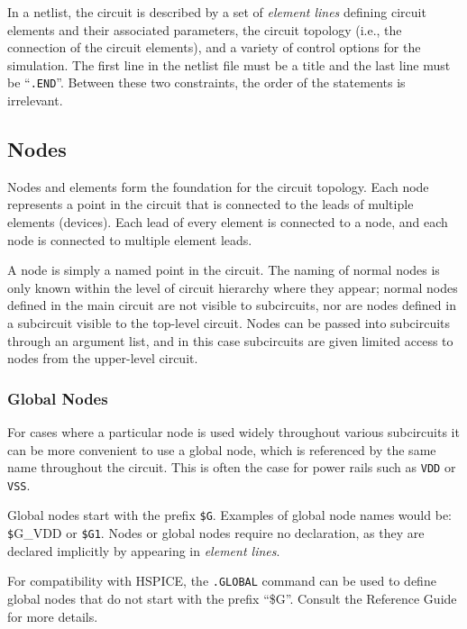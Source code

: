 In a netlist, the circuit is described by a set of \emph{element
lines\/} defining circuit elements and their associated parameters, the circuit topology (i.e., the connection of the circuit elements), and a variety of control options for the simulation. 
The first line in the netlist
file must be a title and the last line must
be ``\texttt{.END}''.  Between these two
constraints, the order of the statements is irrelevant.

\subsection{Nodes}

Nodes and elements form the foundation for the circuit topology. Each node represents a point in the circuit that is connected to the leads of multiple elements (devices). Each lead of every element is connected to a node, and each node is connected to multiple element leads.

A node is simply a named point in the circuit. The naming of normal nodes is only known within the level of circuit hierarchy where they appear; normal nodes defined in the main circuit are not visible to subcircuits, nor are nodes defined in a subcircuit visible to the top-level circuit. Nodes can be passed into subcircuits through an argument list, and in this case subcircuits are given limited access to nodes from the upper-level circuit.  

\subsubsection{Global Nodes}
For cases where a particular node is used widely throughout various
subcircuits it can be more convenient to use a global node, which is
referenced by the same name throughout the circuit.  This is often the
case for power rails such as \texttt{VDD} or \texttt{VSS}.

Global nodes start with the prefix \texttt{\$G}.  Examples of global node names would be:
{\texttt \$G\_VDD} or \texttt{\$G1}.  Nodes or global nodes require no declaration, as they are declared implicitly by appearing in \emph{element lines\/}.

For compatibility with HSPICE, the \texttt{.GLOBAL} command can be 
used to define global nodes that do not start with the prefix ``\$G''.
Consult the \Xyce{} Reference Guide\ReferenceGuide{} for more details. 

